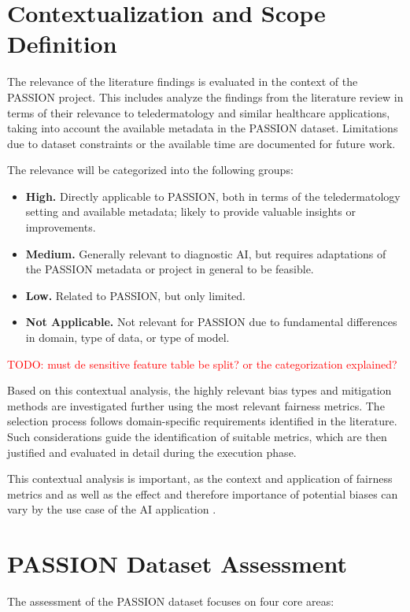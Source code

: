 \documentclass[12pt, a4paper, oneside]{book}   	%
\renewcommand{\todo}[1]{\textcolor{red}{TODO: #1}}
\begin{document}
		\section{Contextualization and Scope Definition} \label{chap:contextMethod}
		The relevance of the literature findings is evaluated in the context of the PASSION project. This includes analyze the findings from the literature review in terms of their relevance to \gls{teledermatology} and similar healthcare applications, taking into account the available metadata in the PASSION dataset. Limitations due to dataset constraints or the available time are documented for future work.
		
		The relevance will be categorized into the following groups:
		\begin{itemize}
			\item \textbf{High.} Directly applicable to PASSION, both in terms of the \gls{teledermatology} setting and available metadata; likely to provide valuable insights or improvements. 
			\item \textbf{Medium.} Generally relevant to diagnostic \gls{AI}, but requires adaptations of the PASSION metadata or project in general to be feasible.
			\item \textbf{Low.} Related to PASSION, but only limited.
			\item \textbf{Not Applicable.} Not relevant for PASSION due to fundamental differences in domain, type of data, or type of model.
		\end{itemize}
		
		\todo{must de sensitive feature table be split? or the categorization explained?}
		
		Based on this contextual analysis, the highly relevant bias types and mitigation methods are investigated further using the most relevant fairness metrics. The selection process follows domain-specific requirements identified in the literature. Such considerations guide the identification of suitable metrics, which are then justified and evaluated in detail during the execution phase.
		
		This contextual analysis is important, as the context and application of fairness metrics and as well as the effect and therefore importance of potential biases can vary by the use case of the \gls{AI} application \autocite{Mehrabi_2021,Barr_2025}.
		
		\section{PASSION Dataset Assessment}\label{chap:datasetAssessmentMethod}
		The assessment of the PASSION dataset focuses on four core areas:
		
\end{document}

